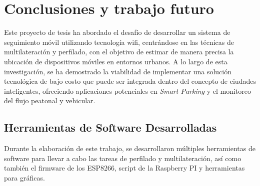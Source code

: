 \chapter{Conclusiones y trabajo futuro}
\label{Capitulo_Conclusiones}
\label{Capitulo_6}
Este proyecto de tesis ha abordado el desafío de desarrollar un sistema de seguimiento móvil utilizando tecnología \acs{wifi}, centrándose en las técnicas de multilateración y perfilado, con el objetivo de estimar de manera precisa la ubicación de dispositivos móviles en entornos urbanos. A lo largo de esta investigación, se ha demostrado la viabilidad de implementar una solución tecnológica de bajo costo que puede ser integrada dentro del concepto de ciudades inteligentes, ofreciendo aplicaciones potenciales en \textit{Smart Parking} y el monitoreo del flujo peatonal y vehicular.
\section{Herramientas de Software Desarrolladas}
\label{herramientas_software}
Durante la elaboración de este trabajo, se desarrollaron múltiples herramientas de software para llevar a cabo las tareas de perfilado y multilateración, así como también el firmware de los ESP8266, script de la Raspberry PI y herramientas para gráficas.

